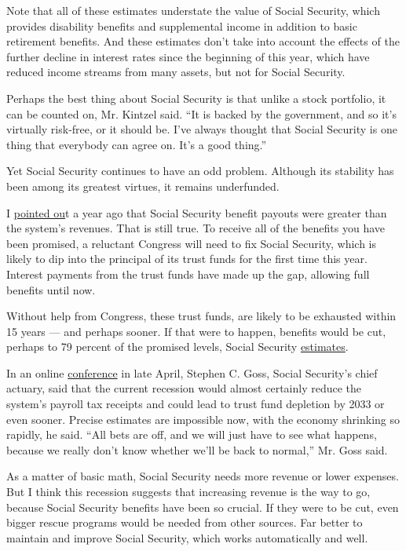 Note that all of these estimates understate the value of Social
Security, which provides disability benefits and supplemental income in
addition to basic retirement benefits. And these estimates don't take
into account the effects of the further decline in interest rates since
the beginning of this year, which have reduced income streams from many
assets, but not for Social Security.

Perhaps the best thing about Social Security is that unlike a stock
portfolio, it can be counted on, Mr. Kintzel said. ``It is backed by the
government, and so it's virtually risk-free, or it should be. I've
always thought that Social Security is one thing that everybody can
agree on. It's a good thing.''

Yet Social Security continues to have an odd problem. Although its
stability has been among its greatest virtues, it remains underfunded.

I
\href{https://www.nytimes3xbfgragh.onion/2019/06/12/business/social-security-shortfall-2020.html}{pointed
ou}t a year ago that Social Security benefit payouts were greater than
the system's revenues. That is still true. To receive all of the
benefits you have been promised, a reluctant Congress will need to fix
Social Security, which is likely to dip into the principal of its trust
funds for the first time this year. Interest payments from the trust
funds have made up the gap, allowing full benefits until now.

Without help from Congress, these trust funds, are likely to be
exhausted within 15 years --- and perhaps sooner. If that were to
happen, benefits would be cut, perhaps to 79 percent of the promised
levels, Social Security
\href{https://www.ssa.gov/OACT/TRSUM/index.html}{estimates}.

In an online
\href{https://bipartisanpolicy.org/event/the-impact-of-covid-19-on-social-security-and-highlights-from-the-trustees-2020-report/}{conference}
in late April, Stephen C. Goss, Social Security's chief actuary, said
that the current recession would almost certainly reduce the system's
payroll tax receipts and could lead to trust fund depletion by 2033 or
even sooner. Precise estimates are impossible now, with the economy
shrinking so rapidly, he said. ``All bets are off, and we will just have
to see what happens, because we really don't know whether we'll be back
to normal,'' Mr. Goss said.

As a matter of basic math, Social Security needs more revenue or lower
expenses. But I think this recession suggests that increasing revenue is
the way to go, because Social Security benefits have been so crucial. If
they were to be cut, even bigger rescue programs would be needed from
other sources. Far better to maintain and improve Social Security, which
works automatically and well.

